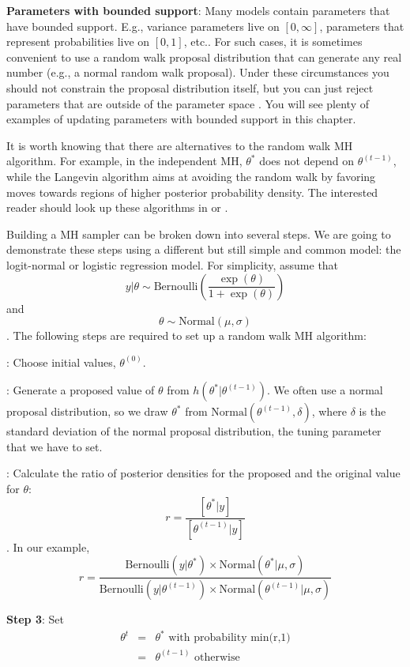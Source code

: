 {\bf Parameters with bounded support}: Many models contain parameters
that have bounded support. E.g., variance parameters live on
$[0,\infty]$, parameters that represent probabilities live on $[0,1]$,
etc..  For such cases, it is sometimes convenient to use a random walk
proposal distribution that can generate any real number (e.g., a
normal random walk proposal). Under these circumstances you should not
constrain the proposal distribution itself, but you can just reject
parameters that are outside of the parameter space
\citep[sec. 6.4.1 in][]{robert_casella:2010}. You will see plenty of examples of
updating parameters with bounded support in this chapter.

It is worth
knowing that there are alternatives to the random walk MH algorithm. For
example, in the independent MH, $\theta^{*}$ does not depend on
$\theta^{(t-1)}$, while the Langevin algorithm \citep{roberts_etal:1998}
aims at avoiding the random walk by favoring moves towards regions of
higher posterior probability density. The interested reader should
look up these algorithms in \citet{robert_casella:2004} or
\citet{robert_casella:2010}.

Building a MH sampler can be broken down into several steps. We are going to demonstrate these steps using a different but still simple and common model: the logit-normal or logistic regression model. For simplicity, assume that
\[
y|\theta \sim \mbox{Bernoulli} \left(\frac{\exp(\theta)}{1+ \exp(\theta)}\right)
\]
and
\[
\theta \sim \mbox{Normal}(\mu, \sigma)
\].
The following steps are required to set up a random walk MH algorithm:

{: Choose initial values, $\theta^{(0)}$.}

{: Generate a proposed value of $\theta$ from $h(\theta^{*}|\theta^{(t-1)})$. }
We often use a normal proposal distribution, so we draw $\theta^{*}$ from $\mbox{Normal}(\theta^{(t-1)}, \delta)$, where $\delta$ is the standard deviation of the normal proposal distribution, the tuning parameter that we have to set.

{: Calculate the ratio of posterior densities for the proposed and the original value for $\theta$: }
\[
r = \frac{[\theta^{*}|y]}  {[\theta^{(t-1)}|y]}
\].
In our example,
\[
r = \frac{\mbox{Bernoulli}(y|\theta^{*}) \times \mbox{Normal}(\theta^{*}|\mu, \sigma)} {\mbox{Bernoulli}(y|\theta^{(t-1)}) \times \mbox{Normal}(\theta^{(t-1)}|\mu, \sigma)}
\]


{\bf Step 3}: Set
\begin{eqnarray*}
\theta^t  &= &   \theta^{*} \mbox{ with probability min(r,1)}\\
	 & = & 	\theta^{(t-1)} \mbox{ otherwise }
\end{eqnarray*}

